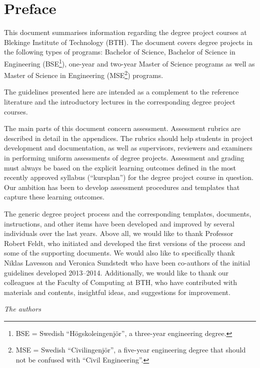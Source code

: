 \documentclass[a4paper,12pt]{book}
\begin{document}
\frontmatter

\setcounter{tocdepth}{1}
\tableofcontents


\chapter*{Preface}
This document summarises information regarding the degree
project courses at Blekinge Institute of Technology (BTH).
The document covers degree projects in the following types of programs:
Bachelor of Science, Bachelor of Science in Engineering (BSE\footnote{BSE =
Swedish ``Högskoleingenjör'', a three-year engineering degree.}),
one-year and two-year Master of Science programs as well as Master of Science in Engineering (MSE\footnote{MSE = Swedish ``Civilingenjör'', a five-year engineering degree that should
not be confused with ``Civil Engineering''.}) programs.

The guidelines presented here are intended as a complement to the
reference literature and the introductory lectures in the corresponding
degree project courses.

The main parts of this document concern assessment. Assessment rubrics are
described in detail in the appendices. The rubrics should help students in project
development and documentation, as well as supervisors, reviewers and examiners
in performing uniform assessments of degree projects.
Assessment and grading must always be based on the explicit learning outcomes
defined in the most recently approved syllabus (``kursplan'') for the degree
project course in question. Our
ambition has been to develop assessment procedures and templates that
capture these learning outcomes.

The generic degree project process and the corresponding
templates, documents, instructions, and other items have been developed
and improved by several individuals over the last years. Above all,
we would like to thank Professor Robert Feldt, who initiated and developed
the first versions of the process and some of the supporting documents.
We would also like to specifically thank Niklas Lavesson and Veronica Sundstedt
who have been co-authors of the initial guidelines developed 2013--2014.
Additionally, we would like to thank our colleagues at the Faculty of Computing at BTH,
who have contributed with materials and contents, insightful
ideas, and suggestions for improvement.

\vspace{1cm}
\emph{The authors}
\end{document}
